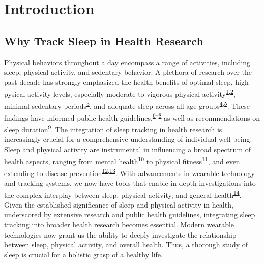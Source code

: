 \documentclass[
  10pt,
]{scrbook}
\begin{document}
\hypertarget{introduction}{%
\chapter{Introduction}\label{introduction}}

\hypertarget{why-track-sleep-in-health-research}{%
\section{Why Track Sleep in Health
Research}\label{why-track-sleep-in-health-research}}

Physical behaviors throughout a day encompass a range of activities,
including sleep, physical activity, and sedentary behavior. A plethora
of research over the past decade has strongly emphasized the health
benefits of optimal sleep, high pysical activity levels, especially
moderate-to-vigorous physical
activity\textsuperscript{\protect\hyperlink{ref-kraus_physical_2019}{1},\protect\hyperlink{ref-lee_effect_2012}{2}},
minimal sedentary
periods\textsuperscript{\protect\hyperlink{ref-wilmot_sedentary_2012}{3}},
and adequate sleep across all age
groups\textsuperscript{\protect\hyperlink{ref-cappuccio_sleep_2010}{4},\protect\hyperlink{ref-jennum_suxf8vn_sundhed_2015}{5}}.
These findings have informed public health
guidelines,\textsuperscript{\protect\hyperlink{ref-kl_physical_2018}{6}--\protect\hyperlink{ref-el-zine_fysisk_nodate}{8}}
as well as recommendations on sleep
duration\textsuperscript{\protect\hyperlink{ref-hirshkowitz_2015}{9}}.
The integration of sleep tracking in health research is increasingly
crucial for a comprehensive understanding of individual well-being.
Sleep and physical activity are instrumental in influencing a broad
spectrum of health aspects, ranging from mental
health\textsuperscript{\protect\hyperlink{ref-biddle_physical_2011}{10}}
to physical
fitness\textsuperscript{\protect\hyperlink{ref-warburton_health_2017}{11}},
and even extending to disease
prevention\textsuperscript{\protect\hyperlink{ref-strath_guide_2013}{12},\protect\hyperlink{ref-arem_leisure_2015}{13}}.
With advancements in wearable technology and tracking systems, we now
have tools that enable in-depth investigations into the complex
interplay between sleep, physical activity, and general
health\textsuperscript{\protect\hyperlink{ref-rollo_whole_2020}{14}}.
Given the established significance of sleep and physical activity in
health, underscored by extensive research and public health guidelines,
integrating sleep tracking into broader health research becomes
essential. Modern wearable technologies now grant us the ability to
deeply investigate the relationship between sleep, physical activity,
and overall health. Thus, a thorough study of sleep is crucial for a
holistic grasp of a healthy life.
\end{document}
